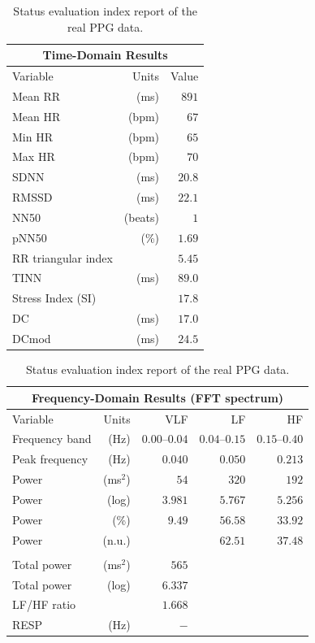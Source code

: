 \documentclass[sigchi,authordraft]{acmart}
\begin{document}
\begin{table}[!t]
  \small
  \centering
  \caption{Status evaluation index report of the real PPG data.}
  \begin{tabular}{lrr}
  \multicolumn{3}{c}{Time-Domain Results} \\
  \toprule
    Variable & Units & Value \\
    \midrule
    Mean RR & (ms) & $891$ \\
    Mean HR & (bpm) & $67$ \\
    Min HR & (bpm) & $65$ \\
    Max HR & (bpm) & $70$ \\
    SDNN & (ms) & $20.8$ \\
    RMSSD & (ms) & $22.1$ \\
    NN50 & (beats) & $1$ \\
    pNN50 & (\%) & $1.69$ \\
    RR triangular index & & $5.45$ \\
    TINN & (ms) & $89.0$ \\
    Stress Index (SI) & & $17.8$ \\
    DC & (ms) & $17.0$ \\
    DCmod & (ms) & $24.5$ \\
    \bottomrule
  \end{tabular}
  \begin{tabular}{lrrrr}
  \multicolumn{5}{c}{Frequency-Domain Results (FFT spectrum)} \\
  \toprule
    Variable & Units & VLF & LF & HF \\
    \midrule
    Frequency band & (Hz) & $0.00\text{--}0.04$ & $0.04\text{--}0.15$ & $0.15\text{--}0.40$ \\
    Peak frequency & (Hz) & $0.040$ & $0.050$ & $0.213$ \\
    Power & (ms${}^\text{2}$) & $54$ & $320$ & $192$ \\
    Power & (log) & $3.981$ & $5.767$ & $5.256$ \\
    Power & (\%) & $9.49$ & $56.58$ & $33.92$ \\
    Power & (n.u.) & & $62.51$ & $37.48$ \\
    \text{-}\text{-}\text{-}\text{-}\text{-}\text{-}\text{-}\text{-}\text{-}\text{-}\text{-}\text{-}\text{-} & & & & \\
    Total power & (ms${}^\text{2}$) & $565$ & & \\
    Total power & (log) & $6.337$ & & \\
    LF/HF ratio & & $1.668$ & & \\
    RESP & (Hz) & $-$ & & \\
    \bottomrule
  \end{tabular}
  \label{tab:report_real}
\end{table}
\end{document}

